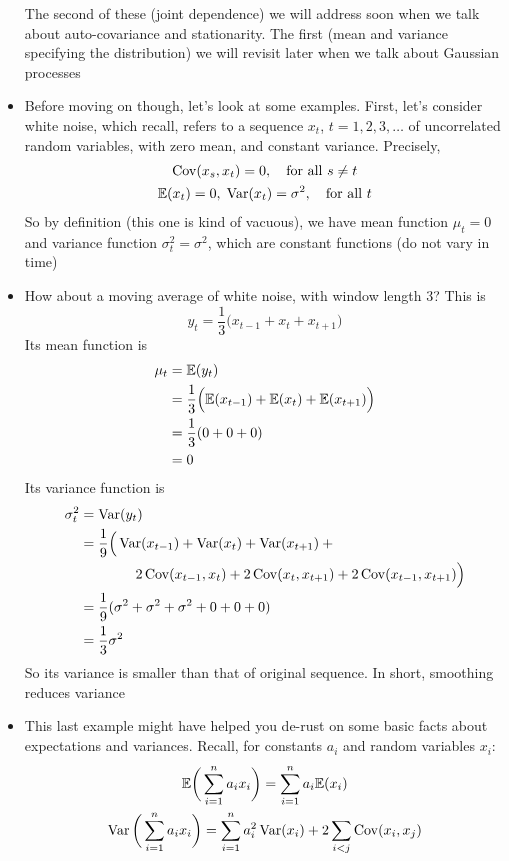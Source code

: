 \documentclass{article}
\begin{document}
\begin{itemize}
  The second of these (joint dependence) we will address soon when we talk about
  auto-covariance and stationarity. The first (mean and variance specifying the 
  distribution) we will revisit later when we talk about Gaussian processes  

\item Before moving on though, let's look at some examples. First, let's
  consider white noise, which recall, refers to a sequence $x_t$, $t =
  1,2,3,\dots$ of uncorrelated random variables, with zero mean, and constant
  variance. Precisely,   
  \begin{gather*}
  \operatorname{Cov}(x_s, x_t) = 0, \quad \text{for all $s \not= t$} \\
  \mathbb{E}(x_t) = 0, \; \operatorname{Var}(x_t) = \sigma^2, \quad \text{for all $t$} 
  \end{gather*}
  So by definition (this one is kind of vacuous), we have mean function $\mu_t =
  0$ and variance function $\sigma^2_t = \sigma^2$, which are constant functions
  (do not vary in time)

\item How about a moving average of white noise, with window length 3? This is 
  \[
  y_t = \frac{1}{3} \Big( x_{t-1} + x_t + x_{t+1} \Big)
  \]
  Its mean function is
  \begin{align*}
  \mu_t &= \mathbb{E}(y_t)  \\
  &= \frac{1}{3} \Big( \mathbb{E}(x_{t-1}) + \mathbb{E}(x_t) + \mathbb{E}(x_{t+1}) \Big) \\ 
  &= \frac{1}{3} ( 0 + 0 + 0 ) \\
  &= 0
  \end{align*}
  Its variance function is
  \begin{align*}
  \sigma^2_t &= \operatorname{Var}(y_t) \\
  &= \frac{1}{9} \Big( \operatorname{Var}(x_{t-1}) + \operatorname{Var}(x_t) + \operatorname{Var}(x_{t+1}) +{} \\
  &\qquad\qquad 2 \operatorname{Cov}(x_{t-1}, x_t) + 2 \operatorname{Cov}(x_t, x_{t+1}) + 2 \operatorname{Cov}(x_{t-1}, 
    x_{t+1}) \Big) \\
  &= \frac{1}{9} ( \sigma^2 + \sigma^2 + \sigma^2 + 0 + 0 + 0) \\
  &= \frac{1}{3} \sigma^2
  \end{align*}
  So its variance is smaller than that of original sequence. In short, smoothing
  reduces variance 

\item This last example might have helped you de-rust on some basic facts about
  expectations and variances. Recall, for constants $a_i$ and random variables
  $x_i$: 
  \begin{gather*}
  \mathbb{E}\bigg( \sum_{i=1}^n a_i x_i \bigg) = \sum_{i=1}^n a_i \mathbb{E}(x_i) \\
  \operatorname{Var}\bigg( \sum_{i=1}^n a_i x_i \bigg) = \sum_{i=1}^n a_i^2 \operatorname{Var}(x_i) + 2
  \sum_{i < j} \operatorname{Cov}(x_i, x_j) 
  \end{gather*}


\end{itemize}
\end{document}

